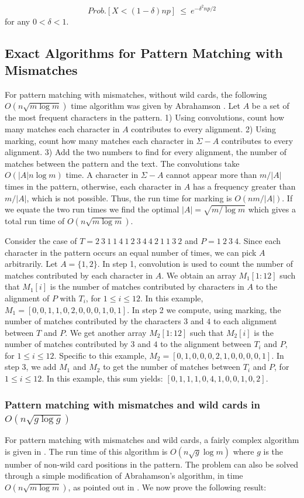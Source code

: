 \begin{equation}\label{eq_chernoff3}
Prob.[X<(1-\delta)np]~\leq~e^{-\delta^2np/2}
\end{equation}
 for any
$0<\delta<1$.

\subsection{Exact Algorithms for Pattern Matching with Mismatches}


For pattern matching with mismatches, without wild cards,
the following $O(n\sqrt{m \log m})$ time algorithm was given by Abrahamson
\cite{ABR87}.
Let $A$ be a set of the most frequent characters
in the pattern. 1) Using convolutions, count how many matches each character in $A$ contributes to
every alignment. 2) Using marking, count how many matches each character
in $\Sigma - A$ contributes to every alignment. 3) Add the two
numbers to find for every alignment, the number of matches between the pattern
and the text. The convolutions take $O(|A| n \log m)$ time. A
character in $\Sigma - A$ cannot appear more than $m/|A|$ times in the pattern,
otherwise, each character in $A$ has a frequency greater than
$m/|A|$, which is not possible. Thus, the run time for marking is $O(n m / |A|)$.
If we equate the two run times we find the optimal $|A| = \sqrt{m / \log m}$ which gives a
total run time of $O(n \sqrt{m \log m})$.


 Consider the case of $T=2~3~1~1~4~1~2~3~4~4~2~1~1~3~2$ and $P=1~2~3~4$. Since each character in the pattern occurs an equal number of times, we can pick $A$ arbitrarily. Let $A=\{1,2\}$. In step 1, convolution is used to count the number of matches contributed by each character in $A$. We obtain an array $M_1[1:12]$ such that $M_1[i]$ is the number of matches contributed by characters in $A$ to the alignment of $P$ with $T_i$, for $1\leq i\leq 12$. In this example, $M_1=[0,0,1,1,0,2,0,0,0,1,0,1]$. In step 2 we compute, using marking, the number of matches contributed by the characters $3$ and $4$ to each alignment between $T$ and $P$. We get another array $M_2[1:12]$ such that $M_2[i]$ is the number of matches contributed by $3$ and $4$ to the alignment between $T_i$ and $P$, for $1\leq i\leq 12$. Specific to this example, $M_2=[0,1,0,0,0,2,1,0,0,0,0,1]$. In step 3, we add $M_1$ and $M_2$ to get the number of matches between $T_i$ and $P$, for $1\leq i\leq 12$. In this example, this sum yields: $[0,1,1,1,0,4,1,0,0,1,0,2]$.


\subsubsection{Pattern matching with mismatches and wild cards in $O(n\sqrt{g
\log{g}})$}
\label{sec_glogm}
For pattern matching with mismatches and wild cards, 
a fairly complex algorithm is given in \cite{ALP04}. The run time of this
algorithm is $O(n \sqrt{g} \log m)$ where $g$ is the number of non-wild card
positions in the pattern. The problem can also be solved through a simple modification of 
Abrahamson's algorithm, in time $O(n\sqrt{m \log m})$, as pointed out in 
\cite{CEP+07}. We now prove the following result:

